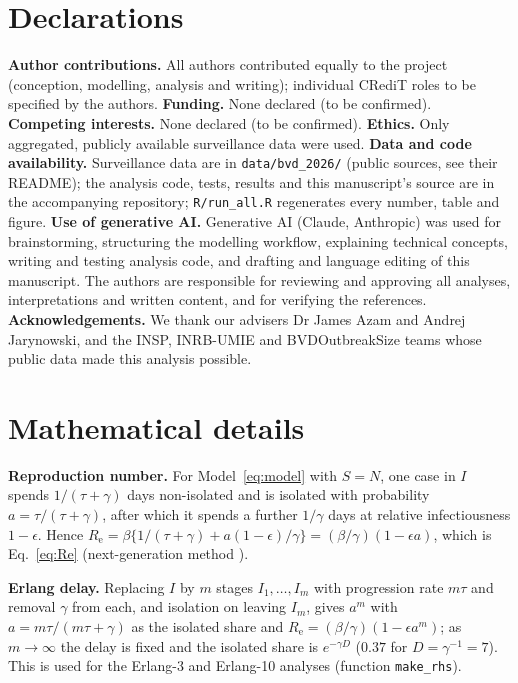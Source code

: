 \documentclass[11pt,a4paper]{article}
\newcommand{\Rt}{R_{\mathrm{e}}}
\begin{document}
\section*{Declarations}
\textbf{Author contributions.} All authors contributed equally to the project (conception, modelling, analysis and writing); individual CRediT roles to be specified by the authors.
\textbf{Funding.} None declared (to be confirmed).
\textbf{Competing interests.} None declared (to be confirmed).
\textbf{Ethics.} Only aggregated, publicly available surveillance data were used.
\textbf{Data and code availability.} Surveillance data are in \texttt{data/bvd\_2026/} (public sources, see their README); the analysis code, tests, results and this manuscript's source are in the accompanying repository; \texttt{R/run\_all.R} regenerates every number, table and figure.
\textbf{Use of generative AI.} Generative AI (Claude, Anthropic) was used for brainstorming, structuring the modelling workflow, explaining technical concepts, writing and testing analysis code, and drafting and language editing of this manuscript. The authors are responsible for reviewing and approving all analyses, interpretations and written content, and for verifying the references.
\textbf{Acknowledgements.} We thank our advisers Dr James Azam and Andrej Jarynowski, and the INSP, INRB-UMIE and BVDOutbreakSize teams whose public data made this analysis possible.

{\small}

\appendix\clearpage\nolinenumbers
\section{Mathematical details}\label{app:math}
\textbf{Reproduction number.} For Model~\eqref{eq:model} with $S=N$, one case in $I$ spends $1/(\tau+\gamma)$ days non-isolated and is isolated with probability $a=\tau/(\tau+\gamma)$, after which it spends a further $1/\gamma$ days at relative infectiousness $1-\epsilon$. Hence $\Rt=\beta\{1/(\tau+\gamma)+a(1-\epsilon)/\gamma\}=(\beta/\gamma)(1-\epsilon a)$, which is Eq.~\eqref{eq:Re} (next-generation method \citep{vandendriessche2002}).

\textbf{Erlang delay.} Replacing $I$ by $m$ stages $I_1,\dots,I_m$ with progression rate $m\tau$ and removal $\gamma$ from each, and isolation on leaving $I_m$, gives $a^m$ with $a=m\tau/(m\tau+\gamma)$ as the isolated share and $\Rt=(\beta/\gamma)(1-\epsilon a^m)$; as $m\to\infty$ the delay is fixed and the isolated share is $e^{-\gamma D}$ ($0.37$ for $D=\gamma^{-1}=7$). This is used for the Erlang-3 and Erlang-10 analyses (function \texttt{make\_rhs}).
\end{document}

